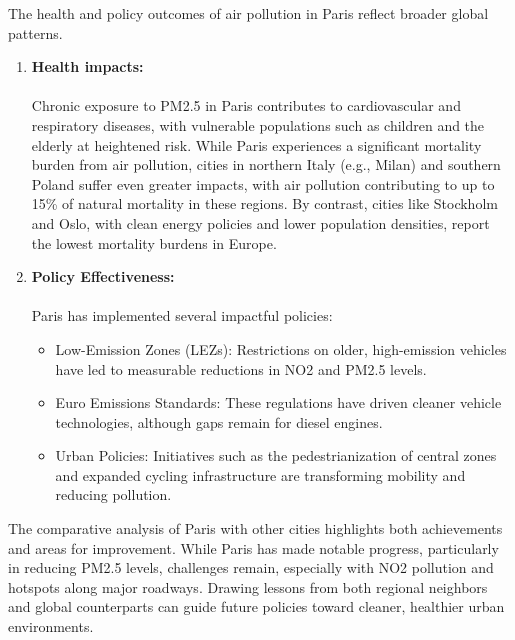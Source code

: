 \documentclass{modeleRapport}
\begin{document}
The health and policy outcomes of air pollution in Paris reflect broader global patterns.\\
\begin{enumerate}
    \item \textbf{Health impacts:}\\\\
    Chronic exposure to PM2.5 in Paris contributes to cardiovascular and respiratory diseases, 
    with vulnerable populations such as children and the elderly at heightened risk.
    While Paris experiences a significant mortality burden from air pollution, cities in northern Italy 
    (e.g., Milan) and southern Poland suffer even greater impacts, with air pollution contributing to up to 15\% 
    of natural mortality in these regions.
    By contrast, cities like Stockholm and Oslo, with clean energy policies and lower population densities, 
    report the lowest mortality burdens in Europe.\\
    \item \textbf{Policy Effectiveness:}\\\\
    Paris has implemented several impactful policies:
    \begin{itemize}
        \item Low-Emission Zones (LEZs): Restrictions on older, high-emission vehicles have led to 
        measurable reductions in NO2 and PM2.5 levels.
        \item Euro Emissions Standards: These regulations have driven cleaner vehicle technologies, 
        although gaps remain for diesel engines.
        \item Urban Policies: Initiatives such as the pedestrianization of central zones and expanded 
        cycling infrastructure are transforming mobility and reducing pollution.\\
    \end{itemize}
\end{enumerate}

The comparative analysis of Paris with other cities highlights both achievements and areas for improvement. 
While Paris has made notable progress, particularly in reducing PM2.5 levels, challenges remain, especially with NO2 
pollution and hotspots along major roadways. Drawing lessons from both regional neighbors and global counterparts can 
guide future policies toward cleaner, healthier urban environments.



\newpage
\end{document}
